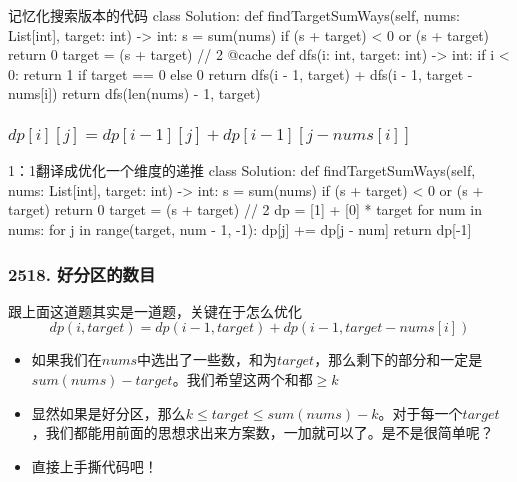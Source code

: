 \begin{frame}[fragile]          %
  
  \begin{codeblock}[language=python]{记忆化搜索版本的代码}
class Solution:
    def findTargetSumWays(self, nums: List[int], target: int) -> int:
        s = sum(nums)
        if (s + target) < 0 or (s + target) %
            return 0
        target = (s + target) // 2
        @cache
        def dfs(i: int, target: int) -> int:
            if i < 0:
                return 1 if target == 0 else 0
            return dfs(i - 1, target) + dfs(i - 1, target - nums[i])
        return dfs(len(nums) - 1, target)
  \end{codeblock}
\end{frame}


\begin{frame}[fragile]          %
  \frametitle{$dp[i][j]=dp[i-1][j]+dp[i-1][j-nums[i]]$}
  \begin{codeblock}[language=python]{1：1翻译成优化一个维度的递推}
class Solution:
    def findTargetSumWays(self, nums: List[int], target: int) -> int:
        s = sum(nums)
        if (s + target) < 0 or (s + target) %
            return 0
        target = (s + target) // 2
        dp = [1] + [0] * target
        for num in nums:
            for j in range(target, num - 1, -1):
                dp[j] += dp[j - num]
        return dp[-1]
  \end{codeblock}
\end{frame}


\begin{frame}[fragile]          %
  \frametitle{\textsc{2518. 好分区的数目}}
  \begin{alertblock}{跟上面这道题其实是一道题，关键在于怎么优化}
    \begin{equation*}
      dp(i,target)=dp(i-1,target)+dp(i-1,target-nums[i])
    \end{equation*}
  \end{alertblock}
  \begin{itemize}
    \item 如果我们在$nums$中选出了一些数，和为$target$，那么剩下的部分和一定是$sum(nums)-target$。我们希望这两个和都$\geq k$
    \item 显然如果是好分区，那么$k \leq target \leq sum(nums)-k$。对于每一个$target$，我们都能用前面的思想求出来方案数，一加就可以了。是不是很简单呢？
    \item 直接上手撕代码吧！
  \end{itemize}
\end{frame}



